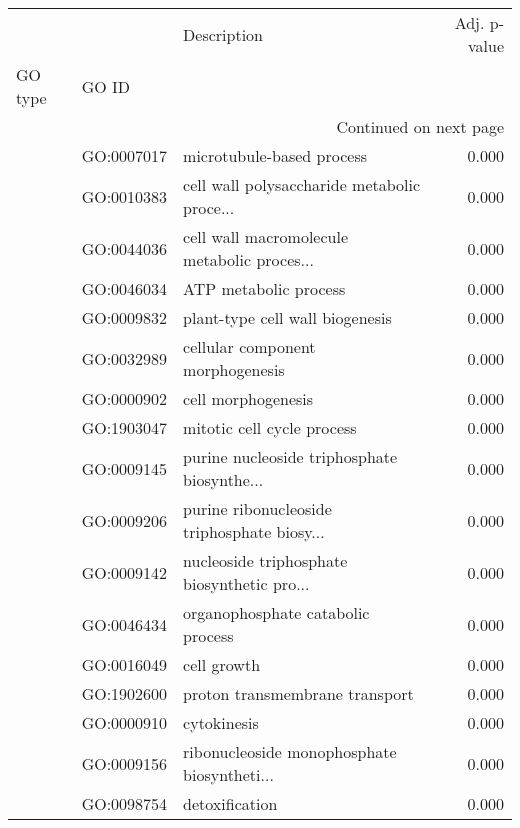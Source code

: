 \begin{longtable}{lllr}
\toprule
   &            &                                  Description &  Adj. p-value \\
GO type & GO ID &                                              &               \\
\midrule
\endhead
\midrule
\multicolumn{4}{r}{{Continued on next page}} \\
\midrule
\endfoot

\bottomrule
\endlastfoot
\multirow{221}{*}{BP} & GO:0007017 &                    microtubule-based process &         0.000 \\
   & GO:0010383 &  cell wall polysaccharide metabolic proce... &         0.000 \\
   & GO:0044036 &  cell wall macromolecule metabolic proces... &         0.000 \\
   & GO:0046034 &                        ATP metabolic process &         0.000 \\
   & GO:0009832 &              plant-type cell wall biogenesis &         0.000 \\
   & GO:0032989 &             cellular component morphogenesis &         0.000 \\
   & GO:0000902 &                           cell morphogenesis &         0.000 \\
   & GO:1903047 &                   mitotic cell cycle process &         0.000 \\
   & GO:0009145 &  purine nucleoside triphosphate biosynthe... &         0.000 \\
   & GO:0009206 &  purine ribonucleoside triphosphate biosy... &         0.000 \\
   & GO:0009142 &  nucleoside triphosphate biosynthetic pro... &         0.000 \\
   & GO:0046434 &            organophosphate catabolic process &         0.000 \\
   & GO:0016049 &                                  cell growth &         0.000 \\
   & GO:1902600 &               proton transmembrane transport &         0.000 \\
   & GO:0000910 &                                  cytokinesis &         0.000 \\
   & GO:0009156 &  ribonucleoside monophosphate biosyntheti... &         0.000 \\
   & GO:0098754 &                               detoxification &         0.000 \\

\end{longtable}
